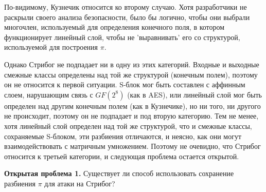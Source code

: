 По-видимому, Кузнечик относится ко второму случаю. Хотя разработчики не раскрыли своего анализа безопасности, было бы логично, чтобы они выбрали многочлен, используемый для определения конечного поля, в котором функционирует линейный слой, чтобы не 'выравнивать' его со структурой, используемой для построения \(\pi\).

Однако Стрибог не подпадает ни в одну из этих категорий. Входные и выходные смежные классы определены над той же структурой (конечным полем), поэтому он не относится к первой ситуации. S-блок мог быть составлен с аффинным слоем, нарушающим связь с $GF(2^8)$ (как в AES), или линейный слой мог быть определен над другим конечным полем (как в Кузнечике), но ни того, ни другого не происходит, поэтому он не подпадает и под вторую категорию. Тем не менее, хотя линейный слой определен над той же структурой, что и смежные классы, сохраняемые S-блоком, эти разбиения отличаются, и неясно, как они могут взаимодействовать с матричным умножением. Поэтому не очевидно, что Стрибог относится к третьей категории, и следующая проблема остается открытой.

\textbf{Открытая проблема 1.} Существует ли способ использовать сохранение разбиения \(\pi\) для атаки на Стрибог?
